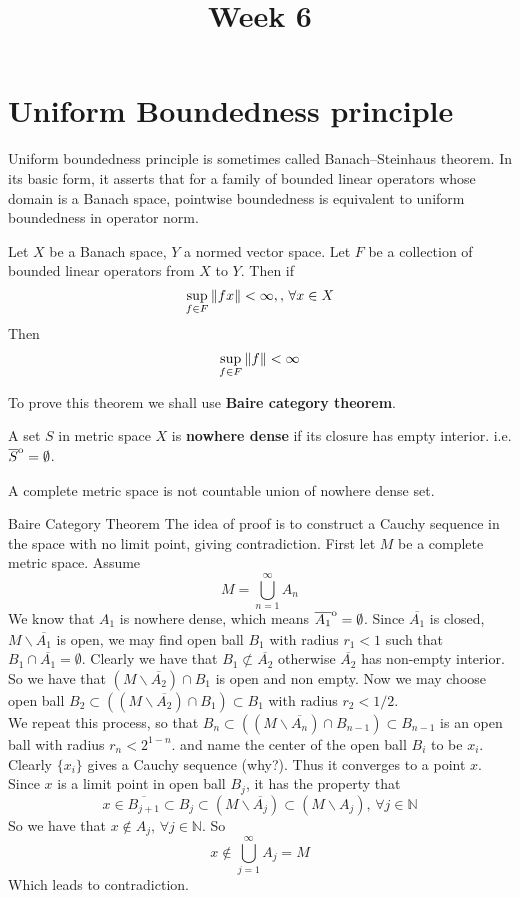 \documentclass{article}
\title{Week 6}
\begin{document}
\maketitle

\section{Uniform Boundedness principle}
Uniform boundedness principle is sometimes called Banach–Steinhaus theorem. In its basic form, it asserts that for a family of bounded linear operators  whose domain is a Banach space, pointwise boundedness is equivalent to uniform boundedness in operator norm.

\begin{theorem}\rm\nextline
	Let $X$ be a Banach space, $Y$ a normed vector space. Let $F$ be a collection of bounded linear operators from $X$ to $Y$. Then if
	$$
		\sup_{f\in F}\left\|{fx}\right\|<\infty,,\,\forall x\in X
	$$
	Then
	$$
		\sup_{f\in F}\left\|{f}\right\|<\infty
	$$
\end{theorem}
To prove this theorem we shall use {\textbf{Baire category theorem}}.

\begin{definition}\rm\nextline
	A set $S$ in metric space $X$ is {\bf nowhere dense} if its closure has empty interior. i.e. $\overline{S}\strut^\mathrm{o}=\emptyset$.
\end{definition}

\begin{theorem}\rm\nextline
	A complete metric space is not countable union of nowhere dense set.
\begin{pf}{Baire Category Theorem}{}
	The idea of proof is to construct a Cauchy sequence in the space with no limit point, giving contradiction. First let $M$ be a complete metric space. Assume
	$$M=\bigcup_{n=1}^\infty A_n$$
	We know that $A_1$ is nowhere dense, which means $\overline{A_1}\strut^\mathrm{o}=\emptyset$. Since $\overline{A_1}$ is closed, $M\backslash \overline{A_1}$ is open, we may find open ball $B_1$ with radius $r_1<1$ such that $B_1\cap\overline{A_1}=\emptyset$. Clearly we have that $B_1\not\subset\overline{A_2}$ otherwise $\overline{A_2}$ has non-empty interior. So we have that $(M\backslash\overline{A_2})\cap B_1$ is open and non empty. Now we may choose open ball $B_2\subset((M\backslash\overline{A_2})\cap B_1)\subset B_1$ with radius $r_2<1/2$. \\
	We repeat this process, so that $B_n\subset((M\backslash\overline{A_n})\cap B_{n-1})\subset B_{n-1}$ is an  open ball with radius $r_n<2^{1-n}$. and name the center of the open ball $B_i$ to be $x_i$. Clearly $\{x_i\}$ gives a Cauchy sequence (why?). Thus it converges to a point $x$. Since $x$ is a limit point in open ball $B_j$, it has  the property that
	$$x\in \overline{B_{j+1}}\subset B_j\subset (M\backslash\overline{A_j})\subset(M\backslash A_j),\,\forall j\in\mathbb{N}$$
	So we have that $x\not\in A_j,\,\forall j\in\mathbb{N}$.
	So
	$$
		x\not\in \bigcup_{j=1}^{\infty}A_j=M
	$$
	Which leads to contradiction.
	\end{pf}
\end{theorem}
\end{document}
